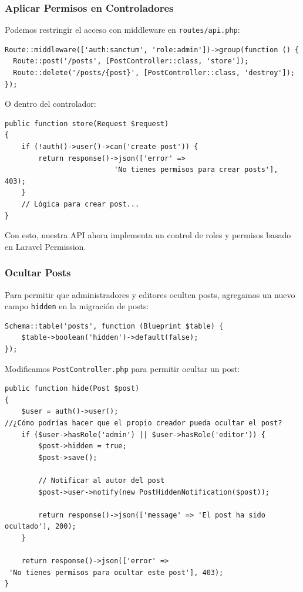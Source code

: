 \documentclass[11pt]{article}
\begin{document}
\subsubsection{Aplicar Permisos en Controladores}
\label{sec:org7f23166}

Podemos restringir el acceso con middleware en \texttt{routes/api.php}:

\begin{verbatim}
Route::middleware(['auth:sanctum', 'role:admin'])->group(function () {
  Route::post('/posts', [PostController::class, 'store']);
  Route::delete('/posts/{post}', [PostController::class, 'destroy']);
});
\end{verbatim}

O dentro del controlador:

\begin{verbatim}
public function store(Request $request)
{
    if (!auth()->user()->can('create post')) {
        return response()->json(['error' =>
                          'No tienes permisos para crear posts'], 403);
    }
    // Lógica para crear post...
}
\end{verbatim}

Con esto, nuestra API ahora implementa un control de roles y permisos
basado en Laravel Permission.

\subsubsection{Ocultar Posts}
\label{sec:orgc617f47}

Para permitir que administradores y editores oculten posts, agregamos
un nuevo campo \texttt{hidden} en la migración de posts:

\begin{verbatim}
Schema::table('posts', function (Blueprint $table) {
    $table->boolean('hidden')->default(false);
});
\end{verbatim}

Modificamos \texttt{PostController.php} para permitir ocultar un post:

\begin{verbatim}
public function hide(Post $post)
{
    $user = auth()->user();
//¿Cómo podrías hacer que el propio creador pueda ocultar el post?
    if ($user->hasRole('admin') || $user->hasRole('editor')) {
        $post->hidden = true;
        $post->save();

        // Notificar al autor del post
        $post->user->notify(new PostHiddenNotification($post));

        return response()->json(['message' => 'El post ha sido ocultado'], 200);
    }

    return response()->json(['error' =>
 'No tienes permisos para ocultar este post'], 403);
}
\end{verbatim}
\end{document}

